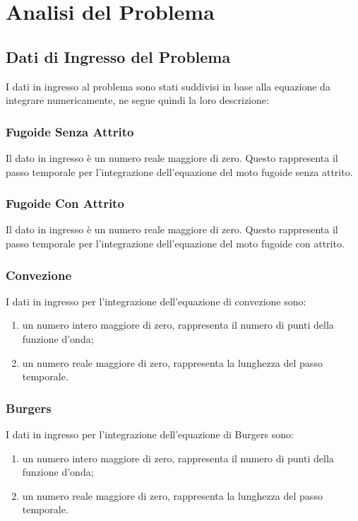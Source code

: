 \documentclass{article}
\begin{document}
\section{Analisi del Problema}

\subsection{Dati di Ingresso del Problema}

I dati in ingresso al problema sono stati suddivisi in base alla equazione da integrare numericamente, ne segue quindi la loro descrizione: 

\subsubsection*{Fugoide Senza Attrito}
    Il dato in ingresso è un numero reale maggiore di zero.
    Questo rappresenta il passo temporale per l'integrazione dell'equazione del moto fugoide senza attrito.
\subsubsection*{Fugoide Con Attrito}
    Il dato in ingresso è un numero reale maggiore di zero. Questo rappresenta il passo temporale per l'integrazione dell'equazione del moto fugoide con attrito.
\subsubsection*{Convezione}
    I dati in ingresso per l'integrazione dell'equazione di convezione sono:
    \begin{enumerate}
        \item un numero intero maggiore di zero, rappresenta il numero di punti della funzione d'onda;
        \item un numero reale maggiore di zero, rappresenta la lunghezza del passo temporale.
    \end{enumerate}
\subsubsection*{Burgers}
    I dati in ingresso per l'integrazione dell'equazione di Burgers sono:
    \begin{enumerate}
        \item un numero intero maggiore di zero, rappresenta il numero di punti della funzione d'onda;
        \item un numero reale maggiore di zero, rappresenta la lunghezza del passo temporale.
    \end{enumerate}
\end{document}

